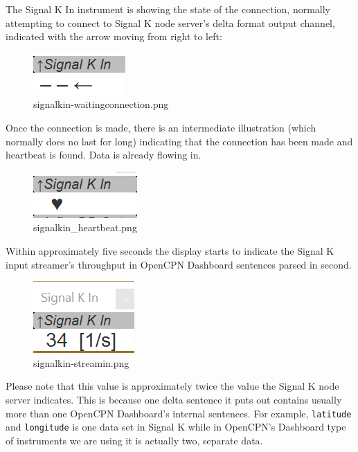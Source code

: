 \documentclass[11pt]{article}
\begin{document}
    The Signal K In instrument is showing the state of the connection,
normally attempting to connect to Signal K node server's delta format
output channel, indicated with the arrow moving from right to left:

    \begin{figure}
\centering
\includegraphics{signalkin-waitingconnection.png}
\caption{signalkin-waitingconnection.png}
\end{figure}

    Once the connection is made, there is an intermediate illustration
(which normally does no last for long) indicating that the connection
has been made and heartbeat is found. Data is already flowing in.

    \begin{figure}
\centering
\includegraphics{signalkin_heartbeat.png}
\caption{signalkin\_heartbeat.png}
\end{figure}

    Within approximately five seconds the display starts to indicate the
Signal K input streamer's throughput in OpenCPN Dashboard sentences
parsed in second.

    \begin{figure}
\centering
\includegraphics{signalkin-streamin.png}
\caption{signalkin-streamin.png}
\end{figure}

    Please note that this value is approximately twice the value the Signal
K node server indicates. This is because one delta sentence it puts out
contains usually more than one OpenCPN Dashboard's internal sentences.
For example, \texttt{latitude} and \texttt{longitude} is one data set in
Signal K while in OpenCPN's Dashboard type of instruments we are using
it is actually two, separate data.
\end{document}
